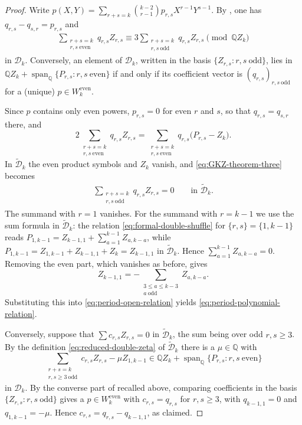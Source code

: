 \documentclass[12pt]{amsart}
\numberwithin{equation}{section}
\theoremstyle{plain}
\newcommand{\odd}{\mathrm{odd}}
\newcommand{\even}{\mathrm{even}}
\newcommand{\QQ}{\mathbb{Q}}
\DeclareMathOperator{\Span}{span}
\newcommand{\Dk}{\mathcal D_k}
\newcommand{\Dtk}{\widetilde{\mathcal D}_k}
\begin{document}
\begin{proof}
Write $p(X,Y)=\sum_{r+s=k}\binom{k-2}{r-1}p_{r,s}X^{r-1}Y^{s-1}$. By
\cite[Theorem~3]{GKZ}, one has $q_{r,s}-q_{s,r}=p_{r,s}$ and
\begin{align}\label{eq:GKZ-theorem-three}
 \sum_{\substack{r+s=k\\r,s\ \even}}q_{r,s}Z_{r,s}
 \equiv 3\sum_{\substack{r+s=k\\r,s\ \odd}}q_{r,s}Z_{r,s}
 \pmod{\QQ Z_k}
\end{align}
in $\Dk$. Conversely, an element of $\Dk$, written in the basis
$\{Z_{r,s}:r,s\ \odd\}$, lies in
$\QQ Z_k+\Span_{\QQ}\{P_{r,s}:r,s\ \even\}$ if and only if its
coefficient vector is $(q_{r,s})_{r,s\ \odd}$ for a (unique)
$p\in W_k^{\even}$.

Since $p$ contains only even powers, $p_{r,s}=0$ for even $r$ and $s$,
so that $q_{r,s}=q_{s,r}$ there, and
\[
 2\sum_{\substack{r+s=k\\r,s\ \even}}q_{r,s}Z_{r,s}
 =\sum_{\substack{r+s=k\\r,s\ \even}}q_{r,s}\bigl(P_{r,s}-Z_k\bigr).
\]
In $\Dtk$ the even product symbols and $Z_k$ vanish, and
\eqref{eq:GKZ-theorem-three} becomes
\begin{align}\label{eq:period-open-relation}
 \sum_{\substack{r+s=k\\r,s\ \odd}}q_{r,s}Z_{r,s}=0
 \qquad\text{in }\Dtk.
\end{align}
The summand with $r=1$ vanishes. For the summand with $r=k-1$ we use
the sum formula in $\Dtk$: the relation
\eqref{eq:formal-double-shuffle} for $\{r,s\}=\{1,k-1\}$ reads
$P_{1,k-1}=Z_{k-1,1}+\sum_{a=1}^{k-1}Z_{a,k-a}$, while
$P_{1,k-1}=Z_{1,k-1}+Z_{k-1,1}+Z_k=Z_{k-1,1}$ in $\Dtk$. Hence
$\sum_{a=1}^{k-1}Z_{a,k-a}=0$. Removing the even part, which vanishes
as before, gives
\[
 Z_{k-1,1}=-\sum_{\substack{3\leq a\leq k-3\\a\ \odd}}Z_{a,k-a}.
\]
Substituting this into \eqref{eq:period-open-relation} yields
\eqref{eq:period-polynomial-relation}.

Conversely, suppose that $\sum c_{r,s}Z_{r,s}=0$ in $\Dtk$, the sum
being over odd $r,s\geq3$. By the definition
\eqref{eq:reduced-double-zeta} of $\Dtk$ there is a $\mu\in\QQ$ with
\[
 \sum_{\substack{r+s=k\\r,s\geq3\ \odd}}c_{r,s}Z_{r,s}
 -\mu Z_{1,k-1}
 \in\QQ Z_k+\Span_{\QQ}\{P_{r,s}:r,s\ \even\}
\]
in $\Dk$. By the converse part of \cite[Theorem~3]{GKZ} recalled
above, comparing coefficients in the basis $\{Z_{r,s}:r,s\ \odd\}$
gives a $p\in W_k^{\even}$ with $c_{r,s}=q_{r,s}$ for $r,s\geq3$, with
$q_{k-1,1}=0$ and $q_{1,k-1}=-\mu$. Hence
$c_{r,s}=q_{r,s}-q_{k-1,1}$, as claimed.


\end{proof}
\end{document}
